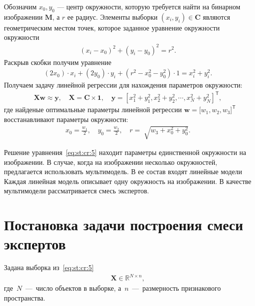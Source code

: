 \documentclass[12pt, twoside]{article}
\numberwithin{equation}{section}
\begin{document}
Обозначим $x_0, y_0$ --- центр окружности, которую требуется найти на бинарном изображении $\textbf{M}$, а $r$ ее радиус. Элементы выборки $\left(x_i, y_i\right)\in\textbf{C}$ являются геометрическим местом точек, которое заданное уравнение окружности окружности
\begin{equation}
\label{eq:st:cr:3}
\begin{aligned}
\left(x_i - x_0\right)^{2}+\left(y_i-y_0\right)^2 = r^2.
\end{aligned}
\end{equation}
Раскрыв скобки получим уравнение
\begin{equation}
\label{eq:st:cr:4}
\begin{aligned}
(2x_0)\cdot x_i + (2y_0)\cdot y_i+(r^2-x_0^2-y_0^2)\cdot1 = x_{i}^2 + y_{i}^2.
\end{aligned}
\end{equation}
Получаем задачу линейной регрессии для нахождения параметров окружности:
\begin{equation}
\label{eq:st:cr:5}
\begin{aligned}
\textbf{X}\textbf{w} \approx \textbf{y},  \quad \textbf{X} = \textbf{C}\times \textbf{1}, \quad \textbf{y} = [x_1^2+y_1^2, x_2^2+y_2^2, \cdots, x_N^2+y_N^2]^{\mathsf{T}},
\end{aligned}
\end{equation}
где найденые оптимальные параметры линейной регрессии $\textbf{w} = \bigr[w_1, w_2, w_3\bigr]^{\mathsf{T}}$ восстанавливают параметры окружности:
\begin{equation}
\label{eq:st:cr:6}
\begin{aligned}
x_0 = \frac{w_1}{2}, \quad y_0 = \frac{w_2}{2}, \quad r = \sqrt[]{w_3+x_{0}^{2}+y_{0}^{2}}.
\end{aligned}
\end{equation}

Решение уравнения~\eqref{eq:st:cr:5} находит параметры единственной окружности на изображении. В случае, когда на изображении несколько окружностей, предлагается использовать мультимодель. В ее состав входят линейные модели Каждая линейная модель описывает одну окружность на изображении. В качестве мультимодели рассматривается смесь экспертов.

\section{Постановка задачи построения смеси экспертов}

Задана выборка из~\eqref{eq:st:cr:5} 
\begin{equation}
\label{eq:st:1}
\begin{aligned}
\textbf{X} \in \mathbb{R}^{N \times n},
\end{aligned}
\end{equation}
где~$N$~---~число объектов в выборке, а~$n$~---~размерность признакового пространства.
\end{document}

